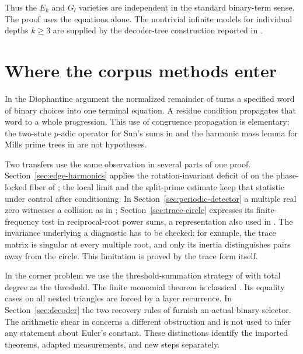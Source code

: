\documentclass[11pt]{article}
\begin{document}
Thus the $E_k$ and $G_l$ varieties are independent in the standard
binary-term sense. The proof uses the equations alone. The
nontrivial infinite models for individual depths $k\ge3$ are supplied
by the decoder-tree construction reported in \cite{vm085}.

\section*{Where the corpus methods enter}
In the Diophantine argument the normalized remainder of \cite{vm090}
turns a specified word of binary choices into one terminal equation.
A residue condition propagates that word to a whole progression.
This use of congruence propagation is elementary; the two-state
$p$-adic operator for Sun's sums in \cite{vm151} and the harmonic
mass lemma for Mills prime trees in \cite{vm141} are not hypotheses.

Two transfers use the same observation in several parts of one proof.
Section~\ref{sec:edge-harmonics} applies the rotation-invariant
deficit of \cite{vm149} on the phase-locked fiber of \cite{vm004};
the local limit and the split-prime estimate keep that statistic
under control after conditioning. In Section~\ref{sec:periodic-detector}
a multiple real zero witnesses a collision as in \cite{vm126};
Section~\ref{sec:trace-circle} expresses its finite-frequency test
in reciprocal-root power sums, a representation also used in
\cite{vm002}. The invariance underlying a diagnostic has to be checked:
for example, the trace matrix is singular at every multiple root,
and only its inertia distinguishes pairs away from the circle.
This limitation is proved by the trace form itself.

In the corner problem we use the threshold-summation strategy of
\cite{vm161} with total degree as the threshold. The finite monomial
theorem is classical \cite{ggr}. Its equality cases on all nested
triangles are forced by a layer recurrence. In Section~\ref{sec:decoder}
the two recovery rules of \cite{vm085} furnish an actual binary selector.
The arithmetic shear in \cite{vm020} concerns a different obstruction
and is not used to infer any statement about Euler's constant.
These distinctions identify the imported theorems, adapted measurements,
and new steps separately.
\end{document}
